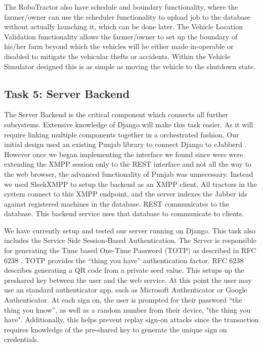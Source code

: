 \documentclass[conference,12pt]{IEEEtran}
\begin{document}
The RoboTractor also have schedule and boundary functionality, where the
farmer/owner can use the scheduler functionality to upload job to the database
without actually launching it, which can be done later. The Vehicle Location
Validation functionality allows the farmer/owner to set up the boundary of
his/her farm beyond which the vehicles will be either made in-operable or
disabled to mitigate the vehicular thefts or accidents. Within the Vehicle
Simulator designed this is as simple as moving the vehicle to the shutdown
state. 

\subsection{Task 5: Server Backend}
The Server Backend is the critical component which connects all further
subsystems.
Extensive knowledge of Django will make this task easier. As it will require
linking multiple components together in a orchestrated fashion. Our initial
design used an existing Punjab library to connect Django to eJabberd
\autocite{_twonds/punjab_2014}. However once we began implementing the interface
we found since were were extending the XMPP session only to the REST interface
and not all the way to the web browser, the advanced functionality of Punjab was
unnecessary.  Instead we used SleekXMPP to setup the backend as an XMPP client.
All tractors in the system connect to this XMPP endpoint, and the server indexes
the Jabber ids against registered machines in the database. REST communicates to
the database. This backend service uses that database to communicate to clients. 

We have
currently setup and tested our server running on Django.
This task also includes the Service Side Session-Based Authentication. The
Server is responsible for generating the Time based One-Time Password (TOTP) as
described in RFC 6238 \autocite{rydell_totp_2011}. TOTP provides the ``thing you
have''
authentication factor. RFC 6238 describes generating a QR code from a private
seed value. This setups up the preshared key between the user and the web
service. At this point the user may use an standard authenticator app, such as
Microsoft Authenticator or Google Authenticator. At each sign on, the user is
prompted for their password ``the thing you know'', as well as a random number
from their device, "the thing you have".  Additionally, this helps prevent
replay sign-on attacks since the transaction requires knowledge of the
pre-shared key to generate the unique sign on credentials.
\end{document}
